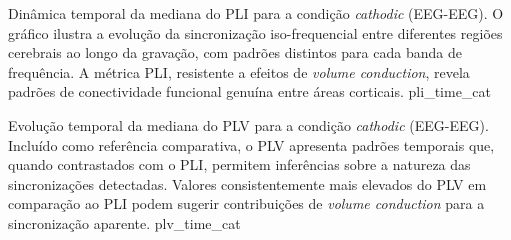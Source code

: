 {Dinâmica temporal da mediana do PLI para a condição \textit{cathodic} (EEG-EEG). O gráfico ilustra a evolução da sincronização iso-frequencial entre diferentes regiões cerebrais ao longo da gravação, com padrões distintos para cada banda de frequência. A métrica PLI, resistente a efeitos de \textit{volume conduction}, revela padrões de conectividade funcional genuína entre áreas corticais.}
{pli_time_cat}

{Evolução temporal da mediana do PLV para a condição \textit{cathodic} (EEG-EEG). Incluído como referência comparativa, o PLV apresenta padrões temporais que, quando contrastados com o PLI, permitem inferências sobre a natureza das sincronizações detectadas. Valores consistentemente mais elevados do PLV em comparação ao PLI podem sugerir contribuições de \textit{volume conduction} para a sincronização aparente.}
{plv_time_cat}